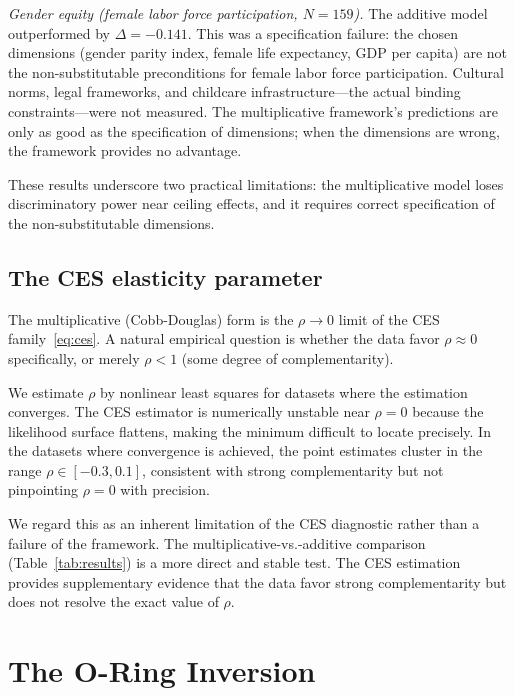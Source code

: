\documentclass[12pt, a4paper]{article}
\theoremstyle{definition}
\theoremstyle{remark}
\begin{document}
\textit{Gender equity (female labor force participation, $N = 159$).} The additive model outperformed by $\Delta = -0.141$. This was a specification failure: the chosen dimensions (gender parity index, female life expectancy, GDP per capita) are not the non-substitutable preconditions for female labor force participation. Cultural norms, legal frameworks, and childcare infrastructure---the actual binding constraints---were not measured. The multiplicative framework's predictions are only as good as the specification of dimensions; when the dimensions are wrong, the framework provides no advantage.

These results underscore two practical limitations: the multiplicative model loses discriminatory power near ceiling effects, and it requires correct specification of the non-substitutable dimensions.

\subsection{The CES elasticity parameter}\label{sec:ces}

The multiplicative (Cobb-Douglas) form is the $\rho \to 0$ limit of the CES family~\eqref{eq:ces}. A natural empirical question is whether the data favor $\rho \approx 0$ specifically, or merely $\rho < 1$ (some degree of complementarity).

We estimate $\rho$ by nonlinear least squares for datasets where the estimation converges. The CES estimator is numerically unstable near $\rho = 0$ because the likelihood surface flattens, making the minimum difficult to locate precisely. In the datasets where convergence is achieved, the point estimates cluster in the range $\rho \in [-0.3, 0.1]$, consistent with strong complementarity but not pinpointing $\rho = 0$ with precision.

We regard this as an inherent limitation of the CES diagnostic rather than a failure of the framework. The multiplicative-vs.-additive comparison (Table~\ref{tab:results}) is a more direct and stable test. The CES estimation provides supplementary evidence that the data favor strong complementarity but does not resolve the exact value of $\rho$.


\section{The O-Ring Inversion}\label{sec:oring}
\end{document}
